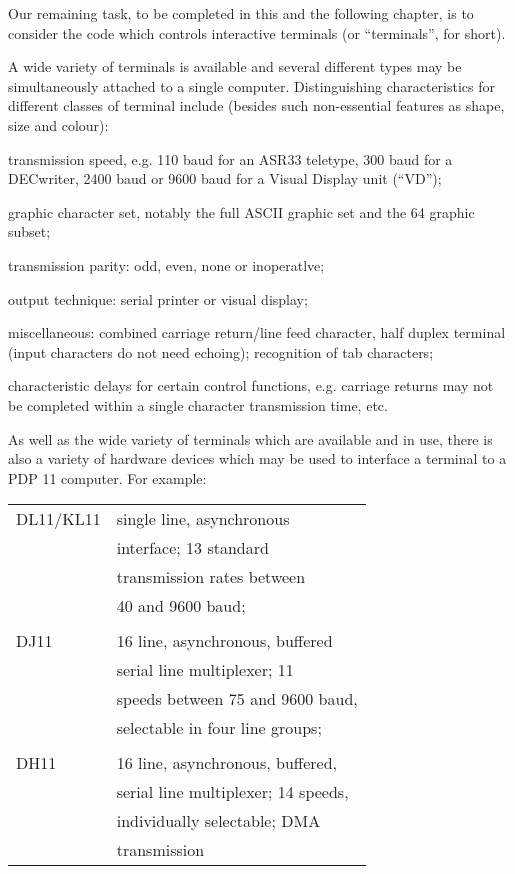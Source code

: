 %
%

Our remaining task, to be completed in
this and the following chapter, is to
consider the code which controls
interactive terminals (or ``terminals'',
for short).

A wide variety of terminals is available and several different types may be
simultaneously attached to a single
computer. Distinguishing characteristics for different classes of terminal
include (besides such non-essential
features as shape, size and colour):

\bd
\item[(a)] transmission speed, e.g. 110
baud for an ASR33 teletype, 300
baud for a DECwriter, 2400 baud
or 9600 baud for a Visual
Display unit (``VD'');

\item[(b)] graphic character set, notably
the full ASCII graphic set and
the 64 graphic subset;

\item[(c)] transmission parity: odd, even,
none or inoperatlve;

\item[(d)] output technique:  serial printer
or visual display;

\item[(e)] miscellaneous: combined carriage
return/line feed character, half
duplex terminal (input characters do not need echoing);
recognition of tab characters;

\item[(f)] characteristic delays for certain control functions, e.g.
carriage returns may not be completed within a single character
transmission time, etc.
\ed

As well as the wide variety of terminals which are available and in use,
there is also a variety of hardware
devices which may be used to interface
a terminal to a PDP 11 computer. For example:

\noindent\begin{tabular}{ll}\\
DL11/KL11 & single line, asynchronous\\
	  & interface; 13 standard\\
	  & transmission rates between\\
	  & 40 and 9600 baud;\\
\\
DJ11 & 16 line, asynchronous, buffered\\
	& serial line multiplexer; 11\\
	& speeds between 75 and 9600 baud,\\
	& selectable in four line groups;\\
\\
DH11 & 16 line, asynchronous, buffered,\\
	&  serial line multiplexer; 14 speeds,\\
	& individually selectable; DMA \\
	& transmission\\
\end{tabular}

